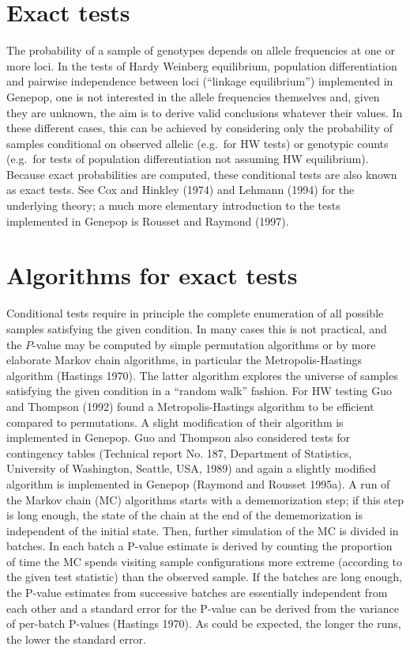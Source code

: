 \documentclass[12pt,]{book}
\theoremstyle{definition}
\theoremstyle{definition}
\theoremstyle{definition}
\theoremstyle{remark}
\begin{document}
\section{Exact tests}\label{exact-tests}

The probability of a sample of genotypes depends on allele frequencies
at one or more loci. In the tests of Hardy Weinberg equilibrium,
population differentiation and pairwise independence between loci
(``linkage equilibrium'') implemented in Genepop, one is not interested
in the allele frequencies themselves and, given they are unknown, the
aim is to derive valid conclusions whatever their values. In these
different cases, this can be achieved by considering only the
probability of samples conditional
on observed allelic (e.g.~for HW tests) or genotypic counts (e.g.~for
tests of population differentiation not assuming HW equilibrium).
Because exact probabilities are computed, these conditional tests are
also known as exact tests. See Cox and Hinkley (1974) and Lehmann (1994)
for the underlying theory; a much more elementary introduction to the
tests implemented in Genepop is Rousset and Raymond (1997).

\section{Algorithms for exact tests}\label{algorithms-for-exact-tests}

Conditional tests require in principle the complete enumeration of all
possible samples satisfying the given condition. In many cases this is
not practical, and the \(P\)-value may be computed by simple permutation
algorithms or by more
elaborate Markov chain algorithms, in particular the Metropolis-Hastings
algorithm (Hastings
1970). The latter
algorithm explores the universe of samples satisfying the given
condition in a ``random walk'' fashion. For HW testing Guo and Thompson
(1992) found a Metropolis-Hastings algorithm to be efficient compared to
permutations. A slight modification of their algorithm is implemented in
Genepop. Guo and Thompson also considered tests for contingency tables
(Technical report No. 187, Department of Statistics, University of
Washington, Seattle, USA, 1989) and again a slightly modified algorithm
is implemented in Genepop (Raymond and Rousset 1995a). A run of the
Markov chain (MC) algorithms starts with a dememorization step; if this
step is long enough, the state of the chain at the end of the
dememorization is independent of the initial state. Then, further
simulation of the MC is divided in batches. In each batch a P-value
estimate is derived by counting the proportion of time the MC spends
visiting sample configurations more extreme (according to the given test
statistic) than the observed sample. If the batches are long enough, the
P-value estimates from successive batches are essentially independent
from each other and a standard error for the P-value can be derived from
the variance of per-batch P-values (Hastings 1970). As could be
expected, the longer the runs, the lower the standard error.
\end{document}

